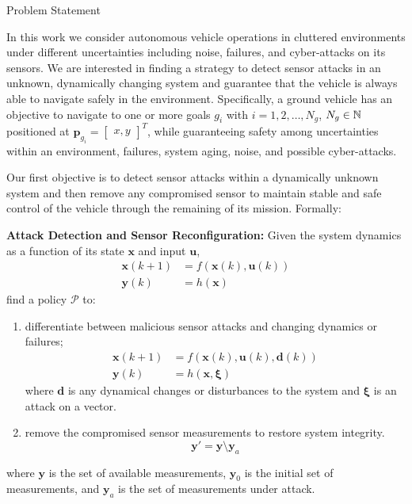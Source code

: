 \begin{section}{Problem Statement}
	
\label{sec:problem}

In this work we consider autonomous vehicle operations in cluttered environments under different uncertainties including noise, failures, and cyber-attacks on its sensors. 
We are interested in finding a strategy to detect sensor attacks in an unknown, dynamically changing system and guarantee that the vehicle is always able to navigate safely in the environment. Specifically, a ground vehicle has an objective to navigate to one or more goals $g_i$ with $ i = 1, 2, \dots, N_g$, $N_g \in \mathbb{N}$ positioned at $\bm{p}_{g_i}={\begin{bmatrix} x,y \end{bmatrix}}^T$, while guaranteeing safety among uncertainties within an environment, failures, system aging, noise, and possible cyber-attacks.



Our first objective is to detect sensor attacks within a dynamically unknown system and then remove any compromised sensor to maintain stable and safe control of the vehicle through the remaining of its mission. Formally:

\begin{problem} 
\label{problem1} {\textbf{Attack Detection and Sensor Reconfiguration:}} 
 Given the system dynamics as a function of its state $ \bm{x} $ and input $ \bm{u}$,
	\begin{equation}
	\begin{split}
		\bm{x}(k+1) &= f(\bm{x}(k), \bm{u}(k)) \\
		\bm{y}(k)&=h(\bm{x})
    \end{split}
	\end{equation}
find a policy $\mathcal{P}$ to:
\begin{enumerate}
	\item differentiate between malicious sensor attacks and changing dynamics or failures; 
	\begin{equation}
	\begin{split}
	\label{eq:detect_attack}
	    \bm{x}(k+1) &= f(\bm{x}(k), \bm{u}(k), \bm{d}(k)) \\
	    \bm{y}(k)&=h(\bm{x}, \bm{\xi})
	\end{split}    
	\end{equation}
where $\bm{d}$ is any dynamical changes or disturbances to the system and $\bm{\xi}$ is an attack on a vector.
	\item remove the compromised sensor measurements to restore system integrity.
	\begin{equation}
	\label{eq:remove_sensors}
	    \bm{y}'=\bm{y} \setminus \bm{y}_a
	\end{equation}
\end{enumerate}
where $\bm{y}$ is the set of available measurements, $\bm{y}_0$ is the initial set of measurements, and $\bm{y}_a$ is the set of measurements under attack.



\end{problem}
\end{section}
